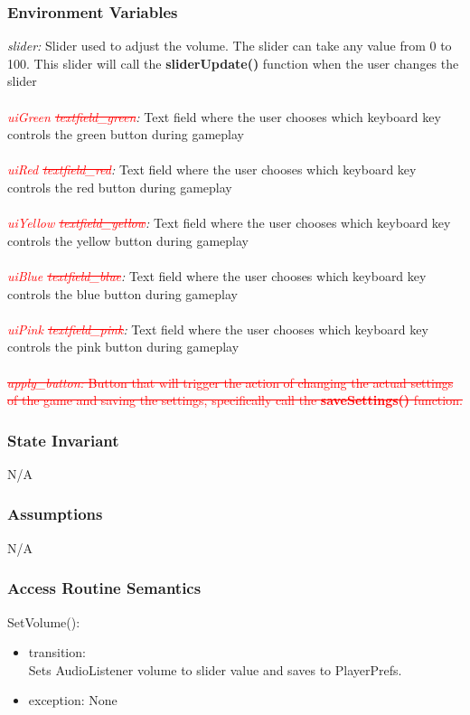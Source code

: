 \documentclass[12pt]{article}
\begin{document}
\subsubsection {Environment Variables}
\textit{slider:} Slider used to adjust the volume. The slider can take any value from 0 to 100. This slider will call the \textbf{sliderUpdate()} function when the user changes the slider\\\\
\textit{\textcolor{red}{uiGreen \sout{textfield\_green}}:} Text field where the user chooses which keyboard key controls the green button during gameplay\\\\
\textit{\textcolor{red}{uiRed \sout{textfield\_red}}:} Text field where the user chooses which keyboard key controls the red button during gameplay\\\\
\textit{\textcolor{red}{uiYellow \sout{textfield\_yellow}}:} Text field where the user chooses which keyboard key controls the yellow button during gameplay\\\\
\textit{\textcolor{red}{uiBlue \sout{textfield\_blue}}:} Text field where the user chooses which keyboard key controls the blue button during gameplay\\\\
\textit{\textcolor{red}{uiPink \sout{textfield\_pink}}:} Text field where the user chooses which keyboard key controls the pink button during gameplay\\\\
\textcolor{red}{\sout{\textit{apply\_button:} Button that will trigger the action of changing the actual settings of the game and saving the settings, specifically call the \textbf{saveSettings()} function.}}

\subsubsection {State Invariant}
N/A
\subsubsection {Assumptions}
N/A
\subsubsection {Access Routine Semantics}

\noindent SetVolume():
\begin{itemize}
	\item transition: \\
	Sets AudioListener volume to slider value and saves to PlayerPrefs.
	\item exception: None
\end{itemize}
\end{document}
